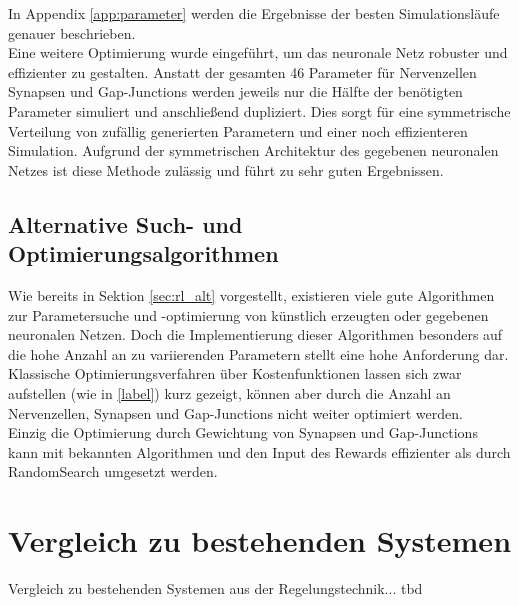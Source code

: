 		In Appendix \ref{app:parameter} werden die Ergebnisse der besten Simulationsläufe genauer beschrieben.\\
		Eine weitere Optimierung wurde eingeführt, um das neuronale Netz robuster und effizienter zu gestalten. Anstatt der gesamten 46 Parameter für Nervenzellen Synapsen und Gap-Junctions werden jeweils nur die Hälfte der benötigten Parameter simuliert und anschließend dupliziert. Dies sorgt für eine symmetrische Verteilung von zufällig generierten Parametern und einer noch effizienteren Simulation. Aufgrund der symmetrischen Architektur des gegebenen neuronalen Netzes ist diese Methode zulässig und führt zu sehr guten Ergebnissen.
	\subsection{Alternative Such- und Optimierungsalgorithmen}
		Wie bereits in Sektion \ref{sec:rl_alt} vorgestellt, existieren  viele gute Algorithmen zur Parametersuche und -optimierung von künstlich erzeugten oder gegebenen neuronalen Netzen. Doch die Implementierung dieser Algorithmen besonders auf die hohe Anzahl an zu variierenden Parametern stellt eine hohe Anforderung dar. Klassische Optimierungsverfahren über Kostenfunktionen lassen sich zwar aufstellen (wie in \ref{label}) kurz gezeigt, können aber durch die Anzahl an Nervenzellen, Synapsen und Gap-Junctions nicht weiter optimiert werden.\\
		Einzig die Optimierung durch Gewichtung von Synapsen und Gap-Junctions kann mit bekannten Algorithmen und den Input des Rewards effizienter als durch RandomSearch umgesetzt werden.

\section{Vergleich zu bestehenden Systemen}
\label{sec:erg_vgl}
	Vergleich zu bestehenden Systemen aus der Regelungstechnik... tbd

